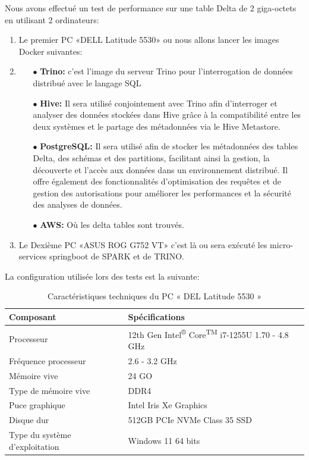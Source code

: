 Nous avons effectué un test de performance sur une table Delta de 2 giga-octets en utilisant 2 ordinateurs:
\begin{enumerate}
    \item Le premier PC «DELL Latitude 5530» ou nous allons lancer les images Docker suivantes:
    \item \begin{enumerate}
        \item[$\bullet$] \textbf{Trino:} c’est l’image du serveur Trino pour l'interrogation de données distribué avec le langage SQL 
        \item[$\bullet$] \textbf{Hive:} Il sera utilisé conjointement avec Trino afin d’interroger et analyser des données stockées dans Hive grâce à la compatibilité entre les deux systèmes et le partage des métadonnées via le Hive Metastore.
        \item[$\bullet$] \textbf{PostgreSQL:} Il sera utilisé afin de stocker les métadonnées des tables Delta, des schémas et des partitions, facilitant ainsi la gestion, la découverte et l'accès aux données dans un environnement distribué. Il offre également des fonctionnalités d'optimisation des requêtes et de gestion des autorisations pour améliorer les performances et la sécurité des analyses de données.
        \item[$\bullet$] \textbf{AWS:} Où les delta tables sont trouvés.
    \end{enumerate}
    \item Le Dexième PC «ASUS ROG G752 VT» c’est là ou sera exécuté les micro-services springboot de SPARK et de TRINO.\@
\end{enumerate}

La configuration utilisée lors des tests est la suivante:
\begin{table}[h]
\centering
\label{tab:caracteristiques}
\begin{tabular}{|l|l|}
\hline
\textbf{Composant} & \textbf{Spécifications} \\ \hline
Processeur & 12th Gen Intel\textsuperscript{®} Core\textsuperscript{TM} i7-1255U 1.70 - 4.8 GHz \\ \hline
Fréquence processeur & 2.6 - 3.2 GHz \\ \hline
Mémoire vive & 24 GO \\ \hline
Type de mémoire vive & DDR4 \\ \hline
Puce graphique & Intel Iris Xe Graphics \\ \hline
Disque dur & 512GB PCIe NVMe Class 35 SSD \\ \hline
Type du système d'exploitation & Windows 11 64 bits \\ \hline
\end{tabular}
\caption{Caractéristiques techniques du PC « DEL Latitude 5530 »}
\end{table}

